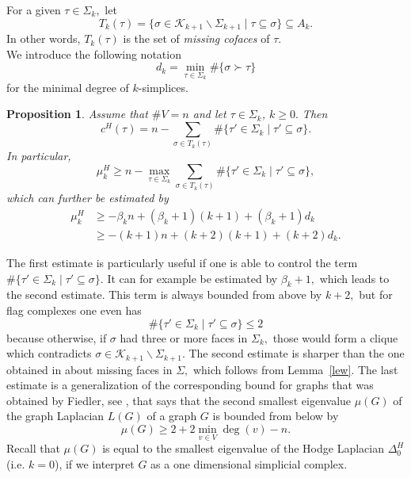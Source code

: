 \documentclass[10pt]{amsart}
\newtheorem{proposition}[theorem]{Proposition}
\theoremstyle{definition}
\newcommand{\K}{\mathcal{K}}
\begin{document}
For a given $\tau\in\Sigma_k,$ let \[T_k(\tau) = \lbrace\sigma\in \K_{k+1}\backslash\Sigma_{k+1}\mid\tau\subseteq\sigma\rbrace\subseteq A_k.\]
In other words, $T_k(\tau)$ is the set of \textit{missing cofaces} of $\tau.$\\
We introduce the following notation
\[d_k = \min_{\tau\in\Sigma_k}\#\lbrace\sigma\succ\tau\rbrace\]
for the minimal degree of $k$-simplices.
\begin{proposition}\label{curvature}
    Assume that $\#V =n$ and let $\tau\in\Sigma_k$, $k\geq 0.$ Then
    \[c^H(\tau) = n-\sum_{\sigma\in T_k(\tau)}\#\lbrace \tau'\in\Sigma_k\mid\tau'\subseteq\sigma\rbrace.\]
In particular,
\[\mu^H_k\geq n-\max_{\tau\in\Sigma_k}\sum_{\sigma\in T_k(\tau)}\#\lbrace \tau'\in\Sigma_k\mid\tau'\subseteq\sigma\rbrace,\]
which can further be estimated by
\begin{align*}
    \mu^H_k&\geq -\beta_kn+(\beta_k+1)(k+1)+(\beta_k+1)d_k
    \\&\geq -(k+1)n+(k+2)(k+1)+(k+2)d_k.
\end{align*}

  
\end{proposition}
The first estimate is particularly useful if one is able to control the term $\#\lbrace \tau'\in\Sigma_k\mid\tau'\subseteq\sigma\rbrace.$ It can for example be estimated by $\beta_k+1,$ which leads to the second estimate. This term is always bounded from above by $k+2,$ but for flag complexes one even has \[\#\lbrace \tau'\in\Sigma_k\mid\tau'\subseteq\sigma\rbrace\leq 2\] because otherwise, if $\sigma$ had three or more faces in $\Sigma_k,$ those would form a clique which contradicts $\sigma\in \K_{k+1}\backslash\Sigma_{k+1}.$ The second estimate is sharper than the one obtained in \cite[Theorem~1.1]{lewfaces} about missing faces in $\Sigma,$ which follows from Lemma~\ref{lew}.
The last estimate is a generalization of the corresponding bound for graphs that was obtained by Fiedler, see \cite[3.8]{Fiedler}, that says that the second smallest eigenvalue $\mu(G)$ of the graph Laplacian $L(G)$ of a graph $G$ is bounded from below by \[\mu(G)\geq 2+2\min_{v\in V}\deg(v)-n.\] Recall that $\mu(G)$ is equal to the smallest eigenvalue of the Hodge Laplacian $\Delta^H_0$ (i.e. $k = 0$), if we interpret $G$ as a one dimensional simplicial complex.
\end{document}

